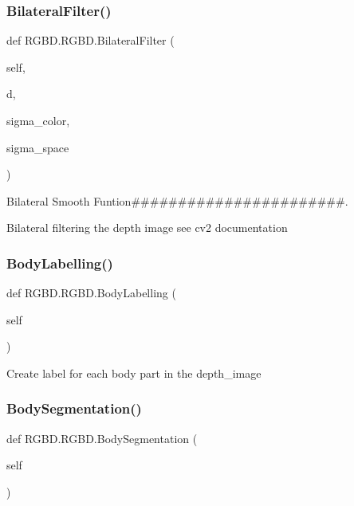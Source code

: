 \subsubsection{Bilateral\+Filter()}
{\footnotesize\ttfamily def R\+G\+B\+D.\+R\+G\+B\+D.\+Bilateral\+Filter (\begin{DoxyParamCaption}\item[{}]{self,  }\item[{}]{d,  }\item[{}]{sigma\+\_\+color,  }\item[{}]{sigma\+\_\+space }\end{DoxyParamCaption})}



Bilateral Smooth Funtion\#\#\#\#\#\#\#\#\#\#\#\#\#\#\#\#\#\#\#\#\#\#\#. 

\begin{DoxyVerb}Bilateral filtering the depth image
see cv2 documentation
\end{DoxyVerb}
 \mbox{\label{class_r_g_b_d_1_1_r_g_b_d_a752dd9b82235dce29c270462a8c38556}} 
\subsubsection{Body\+Labelling()}
{\footnotesize\ttfamily def R\+G\+B\+D.\+R\+G\+B\+D.\+Body\+Labelling (\begin{DoxyParamCaption}\item[{}]{self }\end{DoxyParamCaption})}

\begin{DoxyVerb}Create label for each body part in the depth_image\end{DoxyVerb}
 \mbox{\label{class_r_g_b_d_1_1_r_g_b_d_aeed6372b3733ba2f4291f2cf187c7455}} 
\subsubsection{Body\+Segmentation()}
{\footnotesize\ttfamily def R\+G\+B\+D.\+R\+G\+B\+D.\+Body\+Segmentation (\begin{DoxyParamCaption}\item[{}]{self }\end{DoxyParamCaption})}

